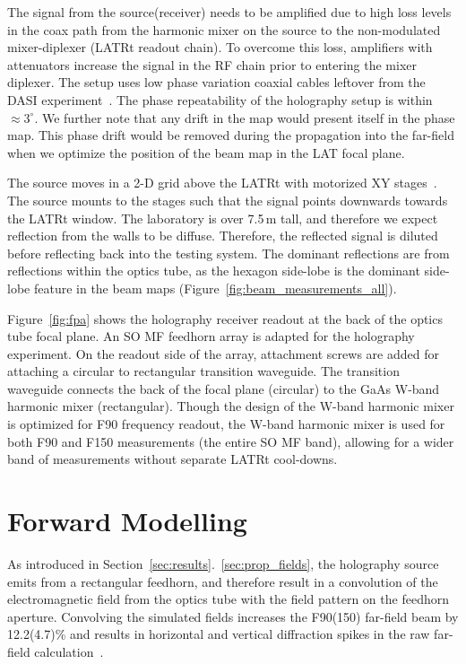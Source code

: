 The signal from the source(receiver) needs to be amplified due to high loss levels in the coax path from the harmonic mixer on the source to the non-modulated mixer-diplexer (LATRt readout chain).  To overcome this loss, amplifiers with attenuators  increase the signal in the RF chain prior to entering the mixer diplexer.  The setup uses low phase variation coaxial cables leftover from the DASI experiment~\cite{CHURCH20031083}.  The phase repeatability of the holography setup is within $\approx3^{\circ}$.  We further note that any drift in the map would present itself in the phase map.  This phase drift would be removed during the propagation into the far-field when we optimize the position of the beam map in the LAT focal plane. 



The source moves in a 2-D grid above the LATRt with motorized XY stages~\cite{stages}.  The source mounts to the stages such that the signal points downwards towards the LATRt window.  The laboratory is over 7.5\,m tall, and therefore we expect reflection from the walls to be diffuse.  Therefore, the reflected signal is diluted before reflecting back into the testing system.  The dominant reflections are from reflections within the optics tube, as the hexagon side-lobe is the dominant side-lobe feature in the beam maps (Figure~\ref{fig:beam_measurements_all}).


Figure~\ref{fig:fpa} shows the holography receiver readout at the back of the optics tube focal plane.  An SO MF feedhorn array is adapted for the holography experiment.  On the readout side of the array, attachment screws are added for attaching a circular to rectangular transition waveguide.  The transition waveguide connects the back of the focal plane (circular) to the GaAs W-band harmonic mixer (rectangular).  Though the design of the W-band harmonic mixer is optimized for F90 frequency readout, the W-band harmonic mixer is used for both F90 and F150 measurements (the entire SO MF band), allowing for a wider band of measurements without separate LATRt cool-downs.

\section{Forward Modelling}
\label{sec:forward_model}

As introduced in Section~\ref{sec:results}.~\ref{sec:prop_fields}, the holography source emits from a rectangular feedhorn, and therefore result in a convolution of the electromagnetic field from the optics tube with the field pattern on the feedhorn aperture.  Convolving the simulated fields increases the F90(150) far-field beam by 12.2(4.7)\% and results in horizontal and vertical diffraction spikes in the raw far-field calculation~\cite{2005ifo..book.....G}.


